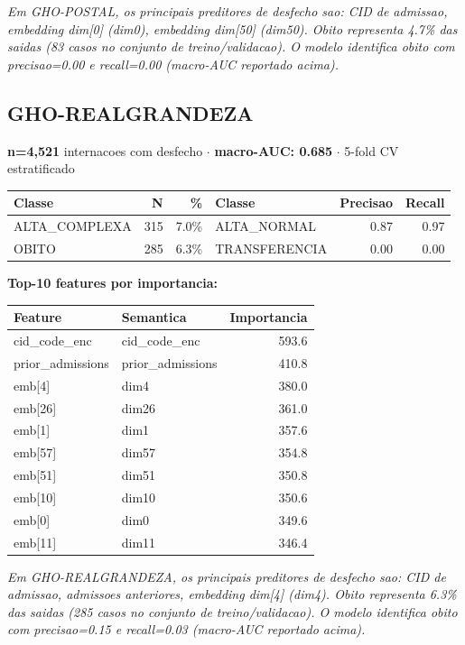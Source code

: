 \documentclass[11pt,a4paper]{article}
\begin{document}
\vspace{4pt}\noindent\textit{Em GHO-POSTAL, os principais preditores de desfecho sao: CID de admissao, embedding dim[0] (dim0), embedding dim[50] (dim50). Obito representa 4.7\% das saidas (83 casos no conjunto de treino/validacao). O modelo identifica obito com precisao=0.00 e recall=0.00 (macro-AUC reportado acima).}

\subsection{GHO-REALGRANDEZA}
\textbf{n=4,521} internacoes com desfecho $\cdot$ \textbf{macro-AUC: 0.685} $\cdot$ 5-fold CV estratificado

\begin{tabular}{lrr|lrr}
\toprule
Classe & N & \% & Classe & Precisao & Recall \\
\midrule
ALTA\_COMPLEXA & 315 & 7.0\% & ALTA\_NORMAL & 0.87 & 0.97 \\
OBITO & 285 & 6.3\% & TRANSFERENCIA & 0.00 & 0.00 \\
\bottomrule
\end{tabular}

\vspace{4pt}\noindent\textbf{Top-10 features por importancia:}

\begin{tabular}{llr}
\toprule
Feature & Semantica & Importancia \\
\midrule
cid\_code\_enc & cid\_code\_enc & 593.6 \\
prior\_admissions & prior\_admissions & 410.8 \\
emb[4] & dim4 & 380.0 \\
emb[26] & dim26 & 361.0 \\
emb[1] & dim1 & 357.6 \\
emb[57] & dim57 & 354.8 \\
emb[51] & dim51 & 350.8 \\
emb[10] & dim10 & 350.6 \\
emb[0] & dim0 & 349.6 \\
emb[11] & dim11 & 346.4 \\
\bottomrule
\end{tabular}

\vspace{4pt}\noindent\textit{Em GHO-REALGRANDEZA, os principais preditores de desfecho sao: CID de admissao, admissoes anteriores, embedding dim[4] (dim4). Obito representa 6.3\% das saidas (285 casos no conjunto de treino/validacao). O modelo identifica obito com precisao=0.15 e recall=0.03 (macro-AUC reportado acima).}
\end{document}
